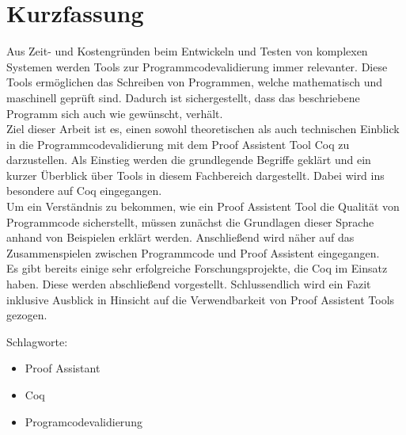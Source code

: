 \section*{Kurzfassung}
\thispagestyle{empty}
Aus Zeit- und Kostengründen beim Entwickeln und Testen von komplexen Systemen werden Tools zur Programmcodevalidierung immer relevanter.
Diese Tools ermöglichen das Schreiben von Programmen, welche mathematisch und maschinell geprüft sind. Dadurch ist sichergestellt, dass das beschriebene Programm sich auch wie gewünscht, verhält.\\
Ziel dieser Arbeit ist es, einen sowohl theoretischen als auch technischen Einblick in die Programmcodevalidierung mit dem Proof Assistent Tool Coq zu darzustellen.
Als Einstieg werden die grundlegende Begriffe geklärt und ein kurzer Überblick über Tools in diesem Fachbereich dargestellt. Dabei wird ins besondere auf Coq eingegangen.\\
Um ein Verständnis zu bekommen, wie ein Proof Assistent Tool die Qualität von Programmcode sicherstellt, müssen zunächst die Grundlagen dieser Sprache anhand von Beispielen erklärt werden. Anschließend wird näher auf das Zusammenspielen zwischen Programmcode und Proof Assistent eingegangen.\\
Es gibt bereits einige sehr erfolgreiche Forschungsprojekte, die Coq im Einsatz haben. Diese werden abschließend vorgestellt. Schlussendlich wird ein Fazit inklusive Ausblick in Hinsicht auf die Verwendbarkeit von Proof Assistent Tools gezogen.
\bigskip

\noindent
Schlagworte:
\begin{itemize}
	\item Proof Assistant
	\item Coq
	\item Programcodevalidierung
\end{itemize}


